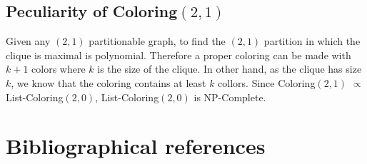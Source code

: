 \documentclass[9pt]{../document-types/entcs} \usepackage{../document-types/entcsmacro}
\newcommand{\?}{\textcolor{warn}{?}}
\begin{document}
\subsection{Peculiarity of {\sc Coloring$(2,1)$}}

Given any $(2,1)$ partitionable graph, to find the $(2,1)$ partition in which the clique is maximal is polynomial. Therefore a proper coloring can be made with $k +1$ colors where $k$ is the size of the clique. In other hand, as the clique has size $k$, we know that the coloring contains at least $k$ collors. Since {\sc Coloring$(2,1)$} $\propto$ {\sc List-Coloring$(2,0)$}, {\sc List-Coloring$(2,0)$} is NP-Complete. 

\section{Bibliographical references}\label{references}

\begin{thebibliography}{10}\label{bibliography}

\end{thebibliography}
\end{document}
